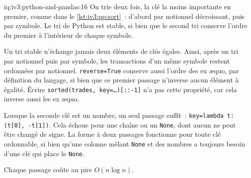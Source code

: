 \begin{solution}{iq:iv3:python-and-pandas:16}
On trie deux fois, la clé la moins importante en premier, comme dans le \cref{lst:iv3:pp:sort}~: d'abord par notionnel décroissant, puis par symbole. Le tri de Python est stable, si bien que le second tri conserve l'ordre du premier à l'intérieur de chaque symbole.
\label{lst:iv3:pp:sort}

Un tri stable n'échange jamais deux éléments de clés égales. Ainsi, après un tri par notionnel puis par symbole, les transactions d'un même symbole restent ordonnées par notionnel. \texttt{reverse=True} conserve aussi l'ordre des ex æquo, par définition du langage, si bien que ce premier passage n'inverse aucun élément à égalité. Écrire \texttt{sorted(trades, key=\dots)[::-1]} n'a pas cette propriété, car cela inverse aussi les ex æquo.

Lorsque la seconde clé est un nombre, un seul passage suffit~: \texttt{key=lambda t: (t[0], -t[1])}. Cela échoue pour une chaîne ou un \texttt{None}, dont aucun ne peut être changé de signe. La forme à deux passages fonctionne pour toute clé ordonnable, si bien qu'une colonne mêlant \texttt{None} et des nombres a toujours besoin d'une clé qui place le \texttt{None}.

Chaque passage coûte au pire $O(n \log n)$.

\end{solution}

